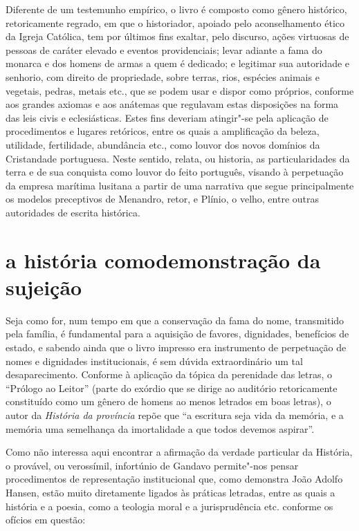 Diferente de um testemunho empírico, o livro é composto como gênero
histórico, retoricamente regrado, em que o historiador, apoiado pelo
aconselhamento ético da Igreja Católica, tem por últimos fins exaltar,
pelo discurso, ações virtuosas de pessoas de caráter elevado e eventos
providenciais; levar adiante a fama do monarca e dos homens de armas a
quem é dedicado; e legitimar sua autoridade e senhorio, com direito de
propriedade, sobre terras, rios, espécies animais e vegetais, pedras,
metais etc., que se podem usar e dispor como próprios, conforme aos
grandes axiomas e aos anátemas que regulavam estas disposições na forma
das leis civis e eclesiásticas. Estes fins deveriam atingir"-se pela
aplicação de procedimentos e lugares retóricos, entre os quais a
amplificação da beleza, utilidade, fertilidade, abundância etc., como
louvor dos novos domínios da Cristandade portuguesa. Neste sentido,
relata, ou historia, as particularidades da terra e de sua conquista
como louvor do feito português, visando à perpetuação da empresa
marítima lusitana a partir de uma narrativa que segue principalmente os
modelos preceptivos de Menandro, retor, e Plínio, o velho, entre outras
autoridades de escrita histórica.

\section{a história como\break demonstração da sujeição}

Seja como for, num tempo em que a conservação da fama do nome,
transmitido pela família, é fundamental para a aquisição de favores,
dignidades, benefícios de estado, e sabendo ainda que o livro impresso
era instrumento de perpetuação de nomes e dignidades institucionais, é
sem dúvida extraordinário um tal desaparecimento. Conforme à aplicação
da tópica da perenidade das letras, o ``Prólogo ao
Leitor'' (parte do exórdio que se dirige ao auditório
retoricamente constituído como um gênero de homens ao menos letrados em
boas letras), o autor da \textit{História da província} repõe que
``a escritura seja vida da memória, e a memória uma
semelhança da imortalidade a que todos devemos aspirar''.

Como não interessa aqui encontrar a afirmação da verdade particular da
História, o provável, ou verossímil, infortúnio de Gandavo permite"-nos
pensar procedimentos de representação institucional que, como demonstra
João Adolfo Hansen, estão muito diretamente ligados às práticas
letradas, entre as quais a história e a poesia, como a teologia moral e
a jurisprudência etc. conforme os ofícios em questão:


